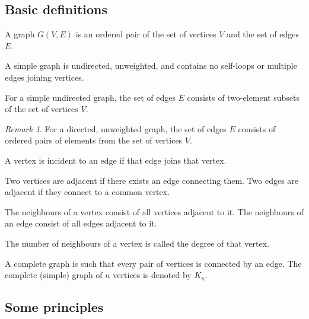 \documentclass[11pt]{article}
\theoremstyle{definition}
\theoremstyle{remark}
\newtheorem*{remark}{Remark}
\numberwithin{equation}{section}
\begin{document}
    \subsection{Basic definitions}
    \begin{definition}
        A graph $G(V, E)$ is an ordered pair of the set of vertices $V$ and the set
        of edges $E$.
    \end{definition}
    \begin{definition}
        A simple graph is undirected, unweighted, and contains no self-loops or
        multiple edges joining vertices.
    \end{definition}
    \begin{definition}
        For a simple undirected graph, the set of edges $E$ consists of two-element
        subsets of the set of vertices $V$.
        \begin{remark}
            For a directed, unweighted graph, the set of edges $E$ consists of ordered
            pairs of elements from the set of vertices $V$.
        \end{remark}
    \end{definition}
    \begin{definition}
        A vertex is incident to an edge if that edge joins that vertex.
    \end{definition}
    \begin{definition}
        Two vertices are adjacent if there exists an edge connecting them.
        Two edges are adjacent if they connect to a common vertex.
    \end{definition}
    \begin{definition}
        The neighbours of a vertex consist of all vertices adjacent to it.
        The neighbours of an edge consist of all edges adjacent to it.

        The number of neighbours of a vertex is called the degree of that vertex.
    \end{definition}

    \begin{definition}
        A complete graph is such that every pair of vertices is connected by an
        edge. The complete (simple) graph of $n$ vertices is denoted by $K_n$.
    \end{definition}

    \subsection{Some principles}
    
\end{document}
